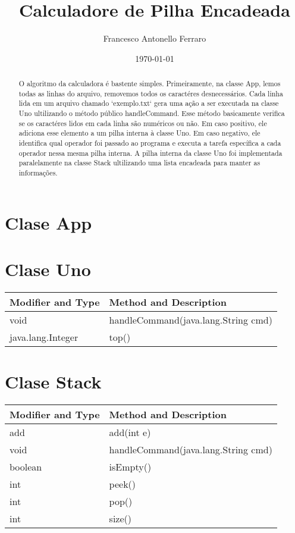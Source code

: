 \documentclass[11pt]{article}
\author{Francesco Antonello Ferraro}
\date{\today}
\title{Calculadore de Pilha Encadeada}
\begin{document}
\maketitle
\begin{abstract}
 O algoritmo da calculadora é bastente simples. Primeiramente, na classe App, lemos todas as linhas do arquivo, removemos todos os caractéres desnecessários. Cada linha lida em um arquivo chamado `exemplo.txt` gera uma ação a ser executada na classe Uno ultilizando o método público handleCommand. 
Esse método basicamente verifica se os caractéres lidos em cada linha são numéricos ou não. Em caso positivo, ele adiciona esse elemento a um pilha interna à classe Uno. Em caso negativo, ele identifica qual operador foi passado ao programa e executa a tarefa específica a cada operador nessa mesma pilha interna. A pilha interna da classe Uno foi implementada paralelamente na classe Stack ultilizando uma lista encadeada para manter as informações.
\end{abstract}

\section{Clase App}
\label{sec:orga83a469}
\section{Clase Uno}
\label{sec:org27ab679}

\begin{center}
\begin{tabular}{ll}
Modifier and Type & Method and Description\\
\hline
void & handleCommand(java.lang.String cmd)\\
java.lang.Integer & top()\\
\end{tabular}
\end{center}


\section{Clase Stack}
\label{sec:org7bdfd7b}

\begin{center}
\begin{tabular}{ll}
Modifier and Type & Method and Description\\
\hline
add & add(int e)\\
void & handleCommand(java.lang.String cmd)\\
boolean & isEmpty()\\
int & peek()\\
int & pop()\\
int & size()\\
\end{tabular}
\end{center}
\end{document}
